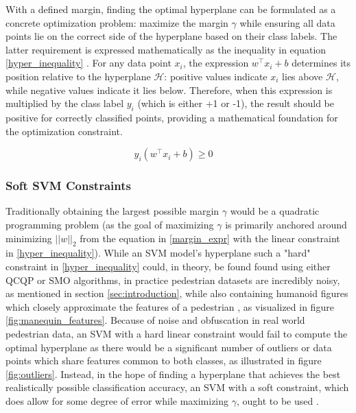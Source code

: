 With a defined margin, finding the optimal hyperplane can be formulated as a concrete optimization problem: maximize the margin $\gamma$ while ensuring all data points lie on the correct side of the hyperplane based on their class labels. The latter requirement is expressed mathematically as the inequality in equation \ref{hyper_inequality} \cite{ng_support}. For any data point $x_i$, the expression $w^\top x_i + b$ determines its position relative to the hyperplane $\mathcal{H}$: positive values indicate $x_i$ lies above $\mathcal{H}$, while negative values indicate it lies below. Therefore, when this expression is multiplied by the class label $y_i$ (which is either +1 or -1), the result should be positive for correctly classified points, providing a mathematical foundation for the optimization constraint.

\begin{equation}\label{hyper_inequality}
y_{i}(w^\top x_{i}+b)\ge 0 \quad 
\end{equation}

\subsubsection{Soft SVM Constraints}\label{sec:soft_constraint_svm}
Traditionally obtaining the largest possible margin $\gamma$ would be a quadratic programming problem \cite{quadratic_programming} (as the goal of maximizing $\gamma$ is primarily anchored around minimizing $||w||_{2}$ from the equation in \ref{margin_expr} with the linear constraint in \ref{hyper_inequality}). While an SVM model's hyperplane such a "hard" constraint in \ref{hyper_inequality} could, in theory, be found found using either QCQP \cite{cornell_svm_notes} or SMO \cite{chang_lin_2011_libsvm} algorithms, in practice pedestrian datasets are incredibly noisy, as mentioned in section \ref{sec:introduction}, while also containing humanoid figures which closely approximate the features of a pedestrian \cite{inria_improved}, as visualized in figure \ref{fig:manequin_features}. Because of noise and obfuscation in real world pedestrian data, an SVM with a hard linear constraint would fail to compute the optimal hyperplane as there would be a significant number of outliers or data points which share features common to both classes, as illustrated in figure \ref{fig:outliers}. Instead, in the hope of finding a hyperplane that achieves the best realistically possible classification accuracy, an SVM with a soft constraint, which does allow for some degree of error while maximizing $\gamma$, ought to be used \cite{dalal_2005_histograms} \cite{cornell_svm_continued}.

